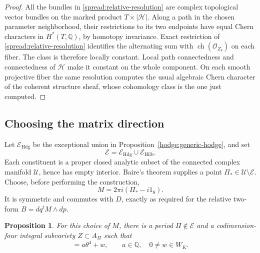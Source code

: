 \documentclass[11pt]{article}
\newtheorem{proposition}[theorem]{Proposition}
\theoremstyle{definition}
\theoremstyle{remark}
\newcommand{\Q}{\mathbb Q}
\DeclareMathOperator{\ch}{ch}
\numberwithin{equation}{section}
\begin{document}
\begin{proof}
All the bundles in \eqref{spread:relative-resolution} are complex
topological vector bundles on the marked product
$T\times|\mathcal H|$.  Along a path in the chosen parameter neighborhood,
their restrictions to its two endpoints have equal Chern characters
in $H^*(T,\Q)$, by homotopy invariance.  Exact restriction of
\eqref{spread:relative-resolution} identifies the alternating sum with
$\ch(\mathcal O_{Z_b})$ on each fiber.  The class is therefore locally
constant.  Local path connectedness and connectedness of $\mathcal H$
make it constant on the whole component.  On each smooth projective
fiber the same resolution computes the usual algebraic Chern character
of the coherent structure sheaf, whose cohomology class is the one just
computed.
\end{proof}

\subsection{Choosing the matrix direction}

Let $\mathcal E_{\mathrm{Hdg}}$ be the exceptional union in
Proposition~\ref{hodge:generic-hodge}, and set
\[
 \mathcal E=\mathcal E_{\mathrm{Hdg}}\cup
               \mathcal E_{\mathrm{Hilb}}.
\]
Each constituent is a proper closed analytic subset of the connected
complex manifold $\mathcal U$, hence has empty interior.  Baire's
theorem supplies a point $\Pi_*\in\mathcal U\setminus\mathcal E$.
Choose, before performing the construction,
\begin{equation}
 M=2\pi i(\Pi_*-i1_8).
 \label{spread:direction}
\end{equation}
It is symmetric and commutes with $D$, exactly as required for the
relative two-form $B=dq^tM\wedge dp$.

\begin{proposition}
\label{spread:period-selection}
For this choice of $M$, there is a period $\Pi\notin\mathcal E$
and a codimension-four integral subvariety $Z\subset A_\Pi$ such that
\begin{equation}
 [Z]=a\theta^4+w,\qquad a\in\Q,\quad 0\ne w\in W_K.
 \label{spread:selected-cycle}
\end{equation}
\end{proposition}
\end{document}
